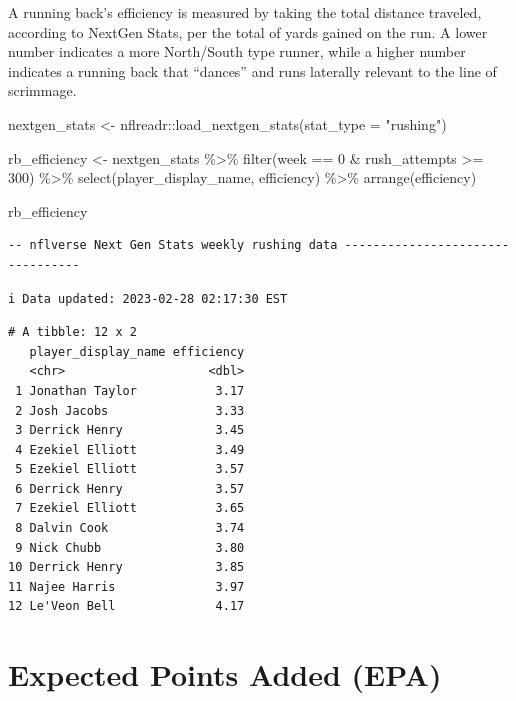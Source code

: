 \documentclass[
  letterpaper,
]{krantz}
\newenvironment{Shaded}{\begin{snugshade}}{\end{snugshade}}
\newcommand{\AttributeTok}[1]{\textcolor[rgb]{0.40,0.45,0.13}{#1}}
\newcommand{\DecValTok}[1]{\textcolor[rgb]{0.68,0.00,0.00}{#1}}
\newcommand{\FunctionTok}[1]{\textcolor[rgb]{0.28,0.35,0.67}{#1}}
\newcommand{\NormalTok}[1]{\textcolor[rgb]{0.00,0.23,0.31}{#1}}
\newcommand{\OtherTok}[1]{\textcolor[rgb]{0.00,0.23,0.31}{#1}}
\newcommand{\SpecialCharTok}[1]{\textcolor[rgb]{0.37,0.37,0.37}{#1}}
\newcommand{\StringTok}[1]{\textcolor[rgb]{0.13,0.47,0.30}{#1}}
\begin{document}
A running back's efficiency is measured by taking the total distance
traveled, according to NextGen Stats, per the total of yards gained on
the run. A lower number indicates a more North/South type runner, while
a higher number indicates a running back that ``dances'' and runs
laterally relevant to the line of scrimmage.

\begin{Shaded}
\begin{Highlighting}[]
\NormalTok{nextgen\_stats }\OtherTok{\textless{}{-}}\NormalTok{ nflreadr}\SpecialCharTok{::}\FunctionTok{load\_nextgen\_stats}\NormalTok{(}\AttributeTok{stat\_type =} \StringTok{"rushing"}\NormalTok{)}

\NormalTok{rb\_efficiency }\OtherTok{\textless{}{-}}\NormalTok{ nextgen\_stats }\SpecialCharTok{\%\textgreater{}\%}
  \FunctionTok{filter}\NormalTok{(week }\SpecialCharTok{==} \DecValTok{0} \SpecialCharTok{\&}\NormalTok{ rush\_attempts }\SpecialCharTok{\textgreater{}=} \DecValTok{300}\NormalTok{) }\SpecialCharTok{\%\textgreater{}\%}
  \FunctionTok{select}\NormalTok{(player\_display\_name, efficiency) }\SpecialCharTok{\%\textgreater{}\%}
  \FunctionTok{arrange}\NormalTok{(efficiency)}

\NormalTok{rb\_efficiency}
\end{Highlighting}
\end{Shaded}

\begin{verbatim}
-- nflverse Next Gen Stats weekly rushing data ---------------------------------
\end{verbatim}

\begin{verbatim}
i Data updated: 2023-02-28 02:17:30 EST
\end{verbatim}

\begin{verbatim}
# A tibble: 12 x 2
   player_display_name efficiency
   <chr>                    <dbl>
 1 Jonathan Taylor           3.17
 2 Josh Jacobs               3.33
 3 Derrick Henry             3.45
 4 Ezekiel Elliott           3.49
 5 Ezekiel Elliott           3.57
 6 Derrick Henry             3.57
 7 Ezekiel Elliott           3.65
 8 Dalvin Cook               3.74
 9 Nick Chubb                3.80
10 Derrick Henry             3.85
11 Najee Harris              3.97
12 Le'Veon Bell              4.17
\end{verbatim}

\hypertarget{expected-points-added-epa}{%
\section{Expected Points Added (EPA)}\label{expected-points-added-epa}}
\end{document}
